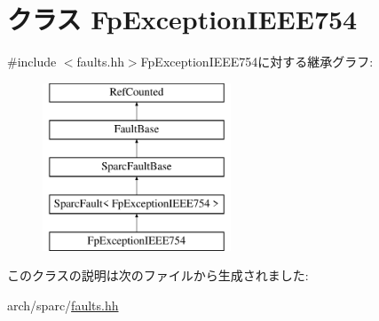 \hypertarget{classSparcISA_1_1FpExceptionIEEE754}{
\section{クラス FpExceptionIEEE754}
\label{classSparcISA_1_1FpExceptionIEEE754}
}


{\ttfamily \#include $<$faults.hh$>$}FpExceptionIEEE754に対する継承グラフ:\begin{figure}[H]
\begin{center}
\leavevmode
\includegraphics[height=5cm]{classSparcISA_1_1FpExceptionIEEE754}
\end{center}
\end{figure}


このクラスの説明は次のファイルから生成されました:\begin{DoxyCompactItemize}
\item 
arch/sparc/\hyperlink{arch_2sparc_2faults_8hh}{faults.hh}\end{DoxyCompactItemize}
